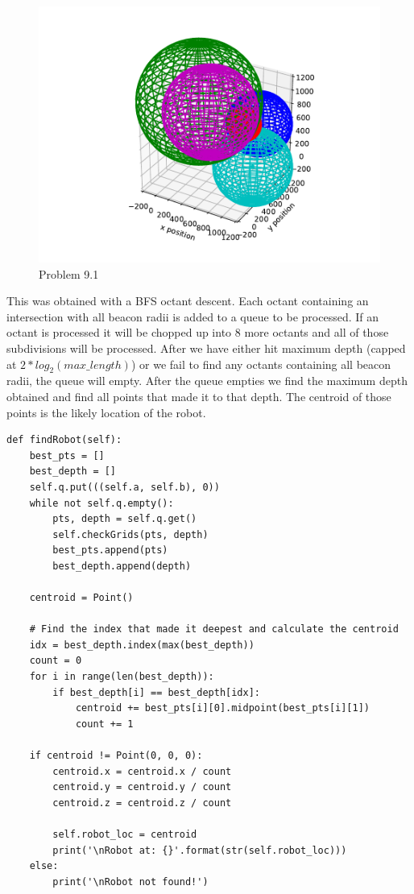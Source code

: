 \documentclass{article}
\begin{document}
\begin{figure}[h]
    \centering
    \includegraphics[pages=1]{problem9-1}
    \caption{Problem 9.1}
    \label{fig:9.1}
\end{figure}

This was obtained with a BFS octant descent. Each octant containing 
an intersection with all beacon radii is added to a queue to be processed. If 
an octant is processed it will be chopped up into 8 more octants and all of 
those subdivisions will be processed. After we have either hit maximum depth 
(capped at $2 * log_2(max\_length)$) or we fail to find any octants containing 
all beacon radii, the queue will empty. After the queue empties we find the 
maximum depth obtained and find all points that made it to that depth. The 
centroid of those points is the likely location of the robot. 

\newpage
\begin{verbatim}
def findRobot(self):
    best_pts = []
    best_depth = []
    self.q.put(((self.a, self.b), 0))
    while not self.q.empty():
        pts, depth = self.q.get()
        self.checkGrids(pts, depth)
        best_pts.append(pts)
        best_depth.append(depth)

    centroid = Point()

    # Find the index that made it deepest and calculate the centroid
    idx = best_depth.index(max(best_depth))
    count = 0
    for i in range(len(best_depth)):
        if best_depth[i] == best_depth[idx]:
            centroid += best_pts[i][0].midpoint(best_pts[i][1])
            count += 1

    if centroid != Point(0, 0, 0):
        centroid.x = centroid.x / count
        centroid.y = centroid.y / count
        centroid.z = centroid.z / count

        self.robot_loc = centroid
        print('\nRobot at: {}'.format(str(self.robot_loc)))
    else:
        print('\nRobot not found!')
\end{verbatim}
\end{document}
